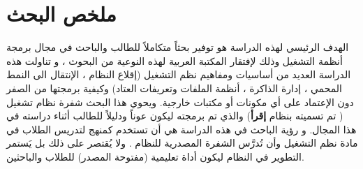 \documentclass[document.tex]{subfiles}
\begin{document}
\chapter*{ملخص البحث}
 الهدف الرئيسي لهذه الدراسة هو توفير بحثاً متكاملاً للطالب والباحث في مجال برمجة أنظمة التشغيل وذلك لإفتقار المكتبة العربية لهذه النوعية من البحوث ، و تناولت هذه الدراسة  العديد من أساسيات ومفاهيم نظم التشغيل (إقلاع النظام ، الإنتقال الى النمط المحمي ، إدارة الذاكرة ، أنظمة الملفات وتعريفات العتاد) وكيفية برمجتها من الصفر دون الإعتماد على أي مكونات أو مكتبات خارجية. ويحوي هذا البحث شفرة نظام تشغيل ( تم تسميته بنظام \textbf{إقرأ}) والذي تم برمجته ليكون عوناً ودليلاً للطالب أثناء دراسته في هذا المجال.
 و رؤية الباحث في هذه الدراسة هي أن تستخدم كمنهج لتدريس الطلاب في مادة نظم التشغيل وأن تُدرَّس الشفرة المصدرية للنظام . ولا يُقتصر على ذلك بل يَستمر التطوير في النظام ليكون أداة تعليمية (مفتوحة المصدر) للطلاب والباحثين.
\end{document}
